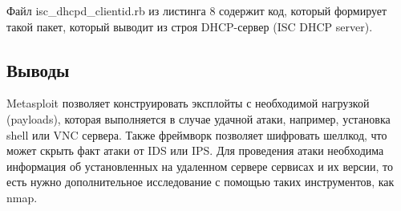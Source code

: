 Файл isc\_dhcpd\_clientid.rb из листинга 8 содержит код, который формирует такой пакет, который выводит из строя DHCP-сервер (ISC DHCP server).



\subsection{Выводы}

Metasploit позволяет конструировать эксплойты с необходимой нагрузкой (payloads), которая выполняется в случае удачной атаки, например, установка shell или VNC сервера. Также фреймворк позволяет шифровать шеллкод, что может скрыть факт атаки от IDS или IPS. Для проведения атаки необходима информация об установленных на удаленном сервере сервисах и их версии, то есть нужно дополнительное исследование с помощью таких инструментов, как nmap.